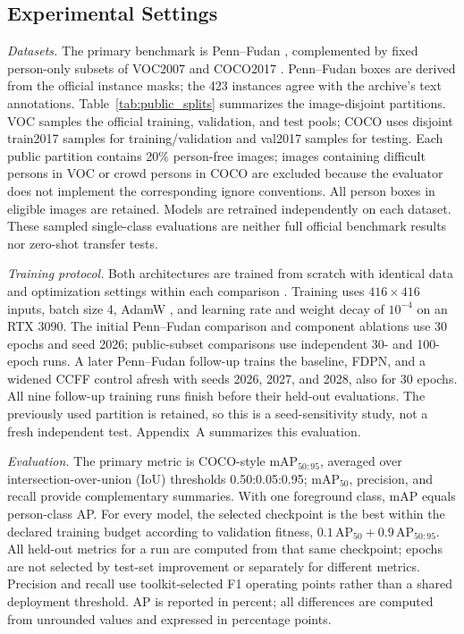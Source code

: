 \documentclass[journal]{IEEEtran}
\newcommand{\mapfifty}{mAP$_{50}$}
\newcommand{\mapcoco}{mAP$_{50:95}$}
\begin{document}
\subsection{Experimental Settings}
\emph{Datasets.} The primary benchmark is Penn--Fudan \cite{wang2007recognition}, complemented by fixed person-only subsets of VOC2007 \cite{everingham2010voc,voc2007official} and COCO2017 \cite{lin2014coco,coco2017official}. Penn--Fudan boxes are derived from the official instance masks; the 423 instances agree with the archive's text annotations. Table~\ref{tab:public_splits} summarizes the image-disjoint partitions. VOC samples the official training, validation, and test pools; COCO uses disjoint train2017 samples for training/validation and val2017 samples for testing. Each public partition contains 20\% person-free images; images containing difficult persons in VOC or crowd persons in COCO are excluded because the evaluator does not implement the corresponding ignore conventions. All person boxes in eligible images are retained. Models are retrained independently on each dataset. These sampled single-class evaluations are neither full official benchmark results nor zero-shot transfer tests.



\emph{Training protocol.} Both architectures are trained from scratch with identical data and optimization settings within each comparison \cite{ultralytics2023,paszke2019pytorch}. Training uses $416\times416$ inputs, batch size 4, AdamW \cite{loshchilov2019adamw}, and learning rate and weight decay of $10^{-4}$ on an RTX 3090. The initial Penn--Fudan comparison and component ablations use 30 epochs and seed 2026; public-subset comparisons use independent 30- and 100-epoch runs. A later Penn--Fudan follow-up trains the baseline, FDPN, and a widened CCFF control afresh with seeds 2026, 2027, and 2028, also for 30 epochs. All nine follow-up training runs finish before their held-out evaluations. The previously used partition is retained, so this is a seed-sensitivity study, not a fresh independent test. Appendix~A summarizes this evaluation.

\emph{Evaluation.} The primary metric is COCO-style \mapcoco{}, averaged over intersection-over-union (IoU) thresholds 0.50:0.05:0.95; \mapfifty{}, precision, and recall provide complementary summaries. With one foreground class, mAP equals person-class AP. For every model, the selected checkpoint is the best within the declared training budget according to validation fitness, $0.1\,\mathrm{AP}_{50}+0.9\,\mathrm{AP}_{50:95}$. All held-out metrics for a run are computed from that same checkpoint; epochs are not selected by test-set improvement or separately for different metrics. Precision and recall use toolkit-selected F1 operating points rather than a shared deployment threshold. AP is reported in percent; all differences are computed from unrounded values and expressed in percentage points.
\end{document}
